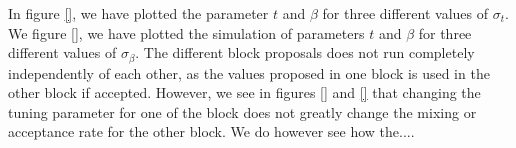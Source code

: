  In figure \ref{}, we have plotted the parameter $t$ and $\beta$ for three different values of $\sigma_t$. We figure \ref{}, we have plotted the simulation of parameters $t$ and $\beta$ for three different values of $\sigma_{\beta}$. The different block proposals does not run completely independently of each other, as the values proposed in one block is used in the other block if accepted. However, we see in figures \ref{} and \ref{} that changing the tuning parameter for one of the block does not greatly change the mixing or acceptance rate for the other block. We do however see how the.... 
